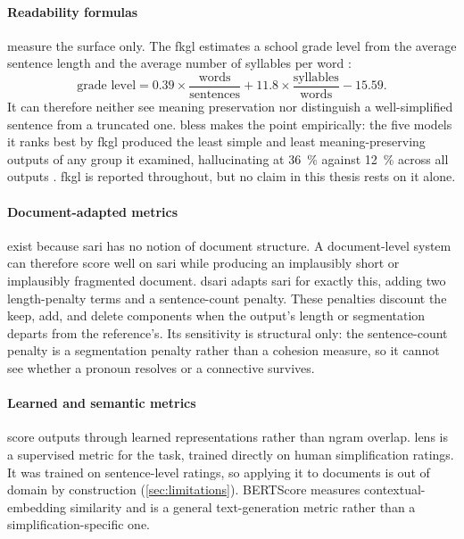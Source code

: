 \paragraph{Readability formulas} measure the surface only.
The \gls{fkgl} estimates a school grade level from the average sentence length and the average number of syllables per word \parencite[14]{Kincaid1975DerivationON}:
\[
	\text{grade level} = 0.39 \times \frac{\text{words}}{\text{sentences}} + 11.8 \times \frac{\text{syllables}}{\text{words}} - 15.59.
\]
It can therefore neither see meaning preservation nor distinguish a well-simplified sentence from a truncated one.
\Gls{bless} makes the point empirically: the five models it ranks best by \gls{fkgl} produced the least simple and least meaning-preserving outputs of any group it examined, hallucinating at \qty{36}{\percent} against \qty{12}{\percent} across all outputs \parencite[13297]{kew-etal-2023-bless}.
\Gls{fkgl} is reported throughout, but no claim in this thesis rests on it alone.

\paragraph{Document-adapted metrics} exist because \gls{sari} has no notion of document structure.
A document-level system can therefore score well on \gls{sari} while producing an implausibly short or implausibly fragmented document.
\Gls{dsari} \parencite[8001--8002]{sun-etal-2021-document} adapts \gls{sari} for exactly this, adding two length-penalty terms and a sentence-count penalty.
These penalties discount the keep, add, and delete components when the output's length or segmentation departs from the reference's.
Its sensitivity is structural only: the sentence-count penalty is a segmentation penalty rather than a cohesion measure, so it cannot see whether a pronoun resolves or a connective survives.

\paragraph{Learned and semantic metrics} score outputs through learned representations rather than \gls{ngram} overlap.
\Gls{lens} \parencite[16385--16386]{maddela-etal-2023-lens} is a supervised metric for the task, trained directly on human simplification ratings.
It was trained on sentence-level ratings, so applying it to documents is out of domain by construction (\cref{sec:limitations}).
BERTScore \parencite[1]{zhang2020bertscoreevaluatingtextgeneration} measures contextual-embedding similarity and is a general text-generation metric rather than a simplification-specific one.


